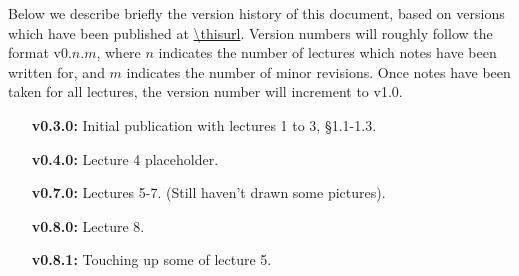 Below we describe briefly the version history of this document, based on
versions which have been published at \url{\thisurl}. Version numbers will
roughly follow the format v0.$n$.$m$, where $n$ indicates the number of
lectures which notes have been written for, and $m$ indicates the number of
minor revisions. Once notes have been taken for all lectures, the version
number will increment to v1.0.

\begin{enumerate}
\item[\bf v0.3.0:] Initial publication with lectures 1 to 3, \S1.1-1.3.
\item[\bf v0.4.0:] Lecture 4 placeholder.
\item[\bf v0.7.0:] Lectures 5-7. (Still haven't drawn some pictures).
\item[\bf v0.8.0:] Lecture 8.
\item[\bf v0.8.1:] Touching up some of lecture 5.
\end{enumerate}
